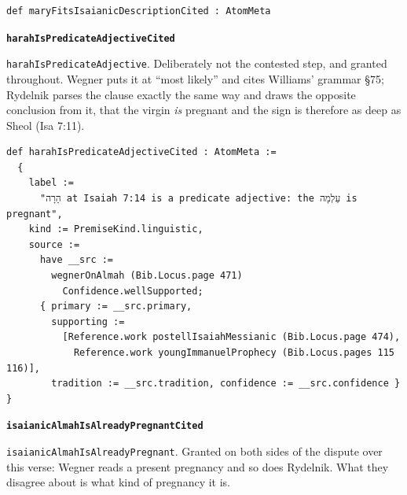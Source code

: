 \documentclass[11pt]{article}
\begin{document}
{\small\begin{verbatim}
def maryFitsIsaianicDescriptionCited : AtomMeta
\end{verbatim}}
\par\medskip\noindent\textbf{\texttt{harah\allowbreak{}Is\allowbreak{}Predicate\allowbreak{}Adjective\allowbreak{}Cited}}\par\nobreak\noindent
\texttt{harah\allowbreak{}Is\allowbreak{}Predicate\allowbreak{}Adjective}. Deliberately not the contested step, and granted throughout. Wegner puts it at “most likely” and cites Williams’ grammar §75; Rydelnik parses the clause exactly the same way and draws the opposite conclusion from it, that the virgin \emph{is} pregnant and the sign is therefore as deep as Sheol (Isa 7:11).

{\small\begin{verbatim}
def harahIsPredicateAdjectiveCited : AtomMeta :=
  {
    label :=
      "הָרָה at Isaiah 7:14 is a predicate adjective: the עַלְמָה is pregnant",
    kind := PremiseKind.linguistic,
    source :=
      have __src :=
        wegnerOnAlmah (Bib.Locus.page 471)
          Confidence.wellSupported;
      { primary := __src.primary,
        supporting :=
          [Reference.work postellIsaiahMessianic (Bib.Locus.page 474),
            Reference.work youngImmanuelProphecy (Bib.Locus.pages 115 116)],
        tradition := __src.tradition, confidence := __src.confidence } }
\end{verbatim}}
\par\medskip\noindent\textbf{\texttt{isaianic\allowbreak{}Almah\allowbreak{}Is\allowbreak{}Already\allowbreak{}Pregnant\allowbreak{}Cited}}\par\nobreak\noindent
\texttt{isaianic\allowbreak{}Almah\allowbreak{}Is\allowbreak{}Already\allowbreak{}Pregnant}. Granted on both sides of the dispute over this verse: Wegner reads a present pregnancy and so does Rydelnik. What they disagree about is what kind of pregnancy it is.
\end{document}

